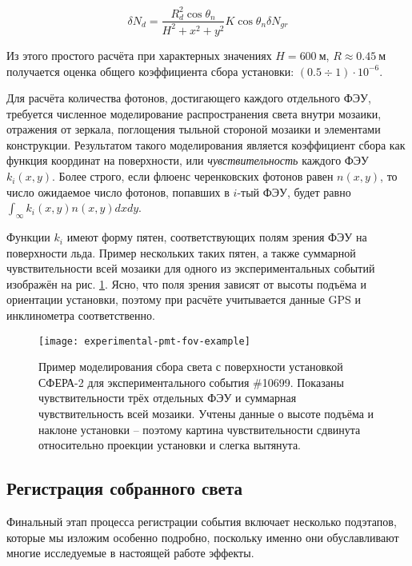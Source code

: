 \begin{equation}
	\delta N_{d} = \frac{R_d^2 \cos \theta_n}{H^2 + x^2 + y^2} K \cos \theta_n \delta N_{gr}
\end{equation}

Из этого простого расчёта при характерных значениях $H = 600~\text{м}$, $R \approx 0.45~\text{м}$ получается оценка общего коэффициента сбора установки: $(0.5 \div 1) \cdot 10^{-6}$.

Для расчёта количества фотонов, достигающего каждого отдельного ФЭУ, требуется численное моделирование распространения света внутри мозаики, отражения от зеркала, поглощения тыльной стороной мозаики и элементами конструкции. Результатом такого моделирования является коэффициент сбора как функция координат на поверхности, или \textit{чувствительность} каждого ФЭУ $k_i(x, y)$. Более строго, если флюенс черенковских фотонов равен $n(x, y)$, то число ожидаемое число фотонов, попавших в $i$-тый ФЭУ, будет равно $\int_{\infty} k_i(x, y) n(x, y) dx dy$.

Функции $k_i$ имеют форму пятен, соответствующих полям зрения ФЭУ на поверхности льда. Пример нескольких таких пятен, а также суммарной чувствительности всей мозаики для одного из экспериментальных событий изображён на рис. \ref{pic:experimental-pmt-fov-example}. Ясно, что поля зрения зависят от высоты подъёма и ориентации установки, поэтому при расчёте учитывается данные GPS и инклинометра соответственно.

\begin{figure}
	\centering
	\texttt{[image: experimental-pmt-fov-example]}
	\caption{Пример моделирования сбора света с поверхности установкой СФЕРА-2 для экспериментального события \#10699. Показаны чувствительности трёх отдельных ФЭУ и суммарная чувствительность всей мозаики. Учтены данные о высоте подъёма и наклоне установки -- поэтому картина чувствительности сдвинута относительно проекции установки и слегка вытянута.}
	\label{pic:experimental-pmt-fov-example}
\end{figure}

\subsection{Регистрация собранного света}

Финальный этап процесса регистрации события включает несколько подэтапов, которые мы изложим особенно подробно, поскольку именно они обуславливают многие исследуемые в настоящей работе эффекты.

